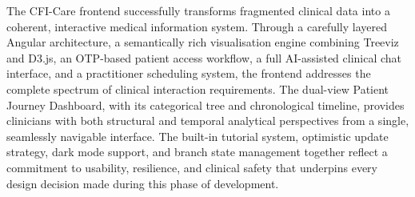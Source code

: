 The CFI-Care frontend successfully transforms fragmented clinical data into a
coherent, interactive medical information system. Through a carefully layered
Angular architecture, a semantically rich visualisation engine combining
Treeviz and D3.js, an OTP-based patient access workflow, a full AI-assisted
clinical chat interface, and a practitioner scheduling system, the frontend
addresses the complete spectrum of clinical interaction requirements. The
dual-view Patient Journey Dashboard, with its categorical tree and
chronological timeline, provides clinicians with both structural and temporal
analytical perspectives from a single, seamlessly navigable interface. The
built-in tutorial system, optimistic update strategy, dark mode support, and
branch state management together reflect a commitment to usability, resilience,
and clinical safety that underpins every design decision made during this phase
of development.